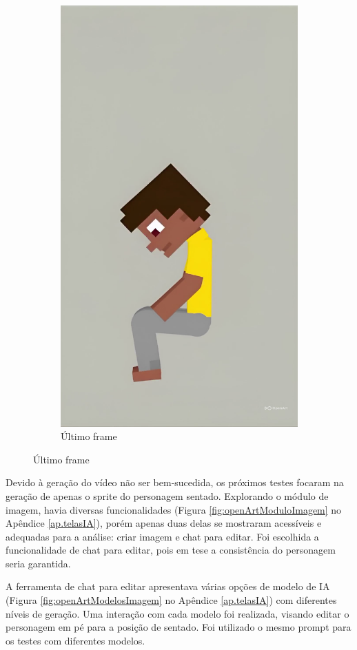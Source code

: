 \begin{figure}[htbp]
\begin{subfigure}{0.45\linewidth}
        \includegraphics[width=0.65\linewidth]{figs/OpenArtAI/frame2.jpg}
        \caption{\small Último frame}
        \label{fig:openArtVideoFrames2}
    \end{subfigure}
\end{figure}

Devido à geração do vídeo não ser bem-sucedida, os próximos testes focaram na geração de apenas o sprite do personagem sentado. Explorando o módulo de imagem, havia diversas funcionalidades (Figura \ref{fig:openArtModuloImagem} no Apêndice \ref{ap.telasIA}), porém apenas duas delas se mostraram acessíveis e adequadas para a análise: criar imagem e chat para editar. Foi escolhida a funcionalidade de chat para editar, pois em tese a consistência do personagem seria garantida.

A ferramenta de chat para editar apresentava várias opções de modelo de IA (Figura \ref{fig:openArtModelosImagem} no Apêndice \ref{ap.telasIA}) com diferentes níveis de geração. Uma interação com cada modelo foi realizada, visando editar o personagem em pé para a posição de sentado. Foi utilizado o mesmo prompt para os testes com diferentes modelos.

